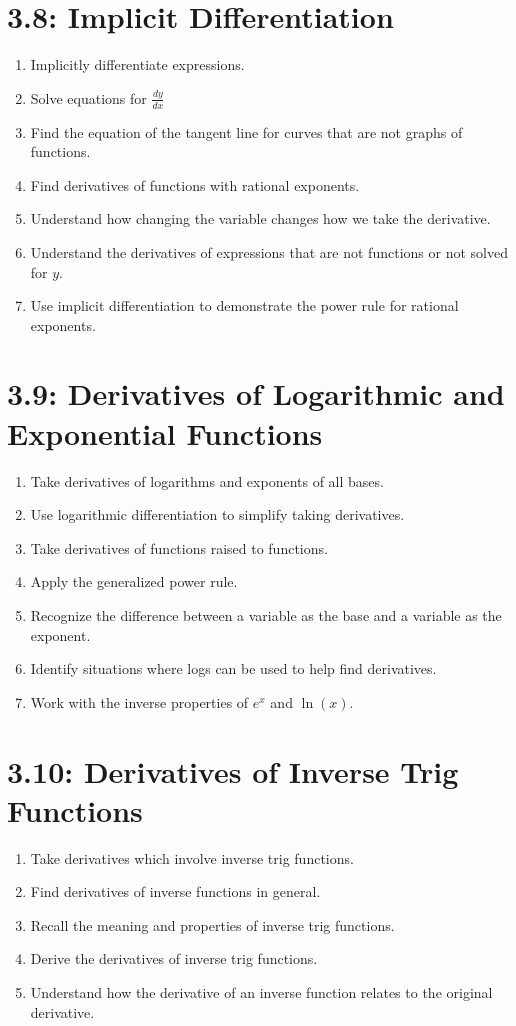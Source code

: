 \documentclass[11pt]{article}
\begin{document}
\section*{3.8: Implicit Differentiation}
\begin{enumerate}
	\item Implicitly differentiate expressions.
	\item Solve equations for $\frac{dy}{dx}$
	\item Find the equation of the tangent line for curves that are not graphs of functions.
	\item Find derivatives of functions with rational exponents.
	\item Understand how changing the variable changes how we take the derivative.
	\item Understand the derivatives of expressions that are not functions or not solved for $y$.
	\item Use implicit differentiation to demonstrate the power rule for rational exponents.
\end{enumerate}

\section*{3.9: Derivatives of Logarithmic and Exponential Functions}
\begin{enumerate}
	\item Take derivatives of logarithms and exponents of all bases.
	\item Use logarithmic differentiation to simplify taking derivatives.
	\item Take derivatives of functions raised to functions.
	\item Apply the generalized power rule.
	\item Recognize the difference between a variable as the base and a variable as the exponent.
	\item Identify situations where logs can be used to help find derivatives.
	\item Work with the inverse properties of $e^x$ and $\ln(x)$.
\end{enumerate}

\section*{3.10: Derivatives of Inverse Trig Functions}
\begin{enumerate}
	\item Take derivatives which involve inverse trig functions.
	\item Find derivatives of inverse functions in general.
	\item Recall the meaning and properties of inverse trig functions.
	\item Derive the derivatives of inverse trig functions.
	\item Understand how the derivative of an inverse function relates to the original derivative.
\end{enumerate}
\end{document}
